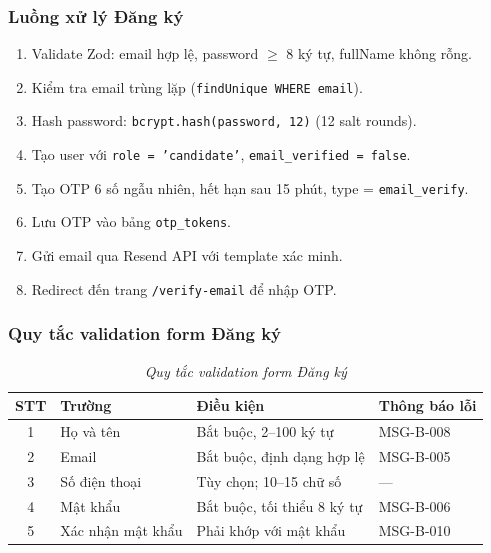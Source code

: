 \subsubsection*{Luồng xử lý Đăng ký}
\begin{enumerate}
    \item Validate Zod: email hợp lệ, password $\ge$ 8 ký tự, fullName không rỗng.
    \item Kiểm tra email trùng lặp (\texttt{findUnique WHERE email}).
    \item Hash password: \texttt{bcrypt.hash(password, 12)} (12 salt rounds).
    \item Tạo user với \texttt{role = 'candidate'}, \texttt{email\_verified = false}.
    \item Tạo OTP 6 số ngẫu nhiên, hết hạn sau 15 phút, type = \texttt{email\_verify}.
    \item Lưu OTP vào bảng \texttt{otp\_tokens}.
    \item Gửi email qua Resend API với template xác minh.
    \item Redirect đến trang \texttt{/verify-email} để nhập OTP.
\end{enumerate}

\subsubsection*{Quy tắc validation form Đăng ký}
\begin{table}[H]
    \centering
    \renewcommand{\arraystretch}{1.3}
    \begin{tabular}{|c|l|l|l|}
        \hline
        \textbf{STT} & \textbf{Trường} & \textbf{Điều kiện} & \textbf{Thông báo lỗi} \\ \hline
        1 & Họ và tên & Bắt buộc, 2--100 ký tự & MSG-B-008 \\ \hline
        2 & Email & Bắt buộc, định dạng hợp lệ & MSG-B-005 \\ \hline
        3 & Số điện thoại & Tùy chọn; 10--15 chữ số & --- \\ \hline
        4 & Mật khẩu & Bắt buộc, tối thiểu 8 ký tự & MSG-B-006 \\ \hline
        5 & Xác nhận mật khẩu & Phải khớp với mật khẩu & MSG-B-010 \\ \hline
    \end{tabular}
    \caption{\textit{Quy tắc validation form Đăng ký}}
\end{table}

